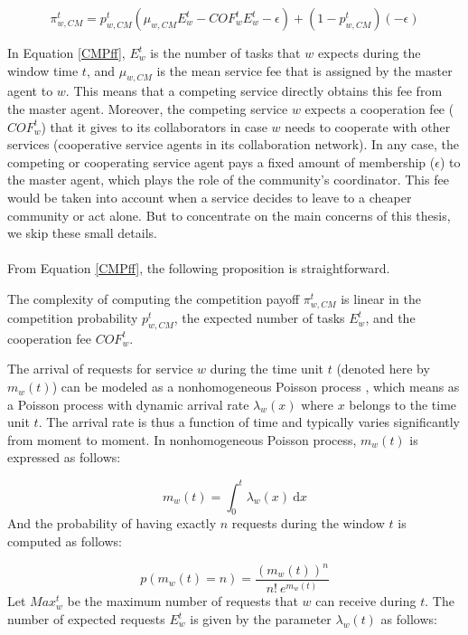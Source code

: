 \begin{equation}\label{CMPff}
\pi_{w,CM}^t=p_{w,CM}^t(\mu_{w, CM}E^t_w-COF_w^t
E^t_w-\epsilon)+(1-p_{w,CM}^t)(-\epsilon)
\end{equation}

In Equation \ref{CMPff}, $E^t_w$ is the number of tasks that $w$
expects during the window time $t$, and $\mu_{w, CM}$ is the mean
service fee that is assigned by the master agent to $w$. This
means that a competing service directly obtains this fee from the
master agent. Moreover, the competing service $w$ expects a
cooperation fee ($COF_w^t$) that it gives to its collaborators in
case $w$ needs to cooperate with other services (cooperative
service agents in its collaboration network). In any case, the
competing or cooperating service agent pays a fixed amount of
membership ($\epsilon$) to the master agent, which plays the role
of the community's coordinator. This fee would be taken into
account when a service decides to leave to a cheaper community or
act alone. But to concentrate on the main concerns of this thesis,
we skip these small details.\\\\
%
From Equation \ref{CMPff}, the following proposition is
straightforward.

\begin{proposition}\label{Complexity-Competition_Payoff}
The complexity of computing the competition payoff $\pi_{w,CM}^t$
is linear in the competition probability $p_{w,CM}^t$, the
expected number of tasks $E^t_w$, and the cooperation fee
$COF_w^t$.
\end{proposition}


The arrival of requests for service $w$ during the time unit $t$
(denoted here by $m_w(t)$) can be modeled as a nonhomogeneous
Poisson process \cite{DBLP:conf/icws/KhosravifarBM10,RePEc:spr:sistpr:v:8:y:2005:i:3:p:311-329}, which
means as a Poisson process with dynamic arrival rate
$\lambda_w(x)$ where $x$ belongs to the time unit $t$. The arrival
rate is thus a function of time and typically varies significantly
from moment to moment. In nonhomogeneous Poisson process, $m_w(t)$
is expressed as follows:

$$ m_w(t)= \int_0^t \! \lambda_w(x) \ \mathrm{d}x$$
%
And the probability of having exactly $n$ requests during the
window $t$ is computed as follows:

$$ p(m_w(t) = n) = \frac{(m_w(t))^n}{n! \ e^{m_w(t)}}  $$
%
Let $Max_w^t$ be the maximum number of requests that $w$ can
receive during $t$. The number of expected requests $E^t_w$ is
given by the parameter $\lambda_w(t)$ as follows:

